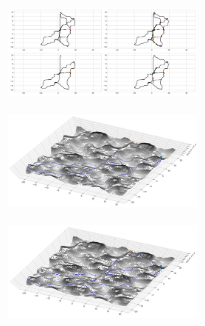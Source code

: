 \documentclass[french]{article}
\begin{document}
			\begin{figure}[H]
				\includegraphics[width=5cm]{Pics/g31.png}
			\end{figure}

			\begin{figure}[H]
				\includegraphics[width=5cm]{Pics/g32.png}
			\end{figure}

			\begin{figure}[H]
				\includegraphics[width=5cm]{Pics/g33.png}
			\end{figure}

			\newpage
\end{document}
